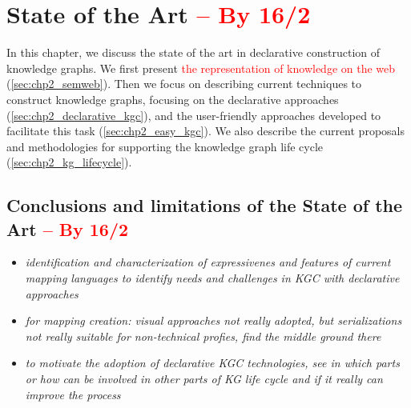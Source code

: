 \chapter{State of the Art \textcolor{red}{-- By 16/2}}
\label{chapter:sota}

In this chapter, we discuss the state of the art in declarative construction of knowledge graphs. We first present \textcolor{red}{the representation of knowledge on the web} (\cref{sec:chp2_semweb}). Then we focus on describing current techniques to construct knowledge graphs, focusing on the declarative approaches (\cref{sec:chp2_declarative_kgc}), and the user-friendly approaches developed to facilitate this task (\cref{sec:chp2_easy_kgc}). We also describe the current proposals and methodologies for supporting the knowledge graph life cycle  (\cref{sec:chp2_kg_lifecycle}).











\section{Conclusions and limitations of the State of the Art \textcolor{red}{-- By 16/2}}


\begin{itemize}
    \item \textit{identification and characterization of expressivenes and features of current mapping languages to identify needs and challenges in KGC with declarative approaches}
    \item \textit{for mapping creation: visual approaches not really adopted, but serializations not really suitable for non-technical profies, find the middle ground there}
    \item \textit{to motivate the adoption of declarative KGC technologies, see in which parts or how can be involved in other parts of KG life cycle and if it really can improve the process}
\end{itemize}